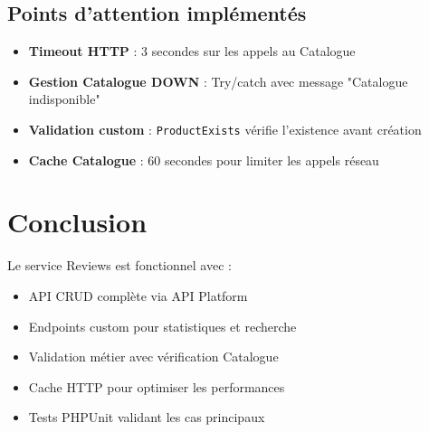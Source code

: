 \documentclass[11pt,a4paper]{article}
\begin{document}
\subsection{Points d'attention implémentés}

\begin{itemize}
    \item \textbf{Timeout HTTP} : 3 secondes sur les appels au Catalogue
    \item \textbf{Gestion Catalogue DOWN} : Try/catch avec message "Catalogue indisponible"
    \item \textbf{Validation custom} : \texttt{ProductExists} vérifie l'existence avant création
    \item \textbf{Cache Catalogue} : 60 secondes pour limiter les appels réseau
\end{itemize}

\section{Conclusion}

Le service Reviews est fonctionnel avec :
\begin{itemize}
    \item API CRUD complète via API Platform
    \item Endpoints custom pour statistiques et recherche
    \item Validation métier avec vérification Catalogue
    \item Cache HTTP pour optimiser les performances
    \item Tests PHPUnit validant les cas principaux
\end{itemize}
\end{document}
